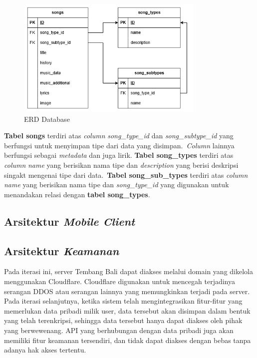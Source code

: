 \begin{figure}[H]
    \centering
    \includegraphics[width=0.8\textwidth]{assets/erd.png}
    \caption{ERD Database}
\end{figure}

\textbf{Tabel songs} terdiri atas \textit{column} \textit{song\_type\_id} dan \textit{song\_subtype\_id} yang berfungsi untuk menyimpan tipe dari data yang disimpan.\
\textit{Column} lainnya berfungsi sebagai \textit{metadata} dan juga lirik.
\textbf{Tabel song\_types} terdiri atas \textit{column} \textit{name} yang berisikan nama tipe dan \textit{description} yang berisi deskripsi singakt mengenai tipe dari data.\
\textbf{Tabel song\_sub\_types} terdiri atas \textit{column} \textit{name} yang berisikan nama tipe dan \textit{song\_type\_id} yang digunakan untuk menandakan relasi dengan \textbf{tabel song\_types}.\

\subsection{Arsitektur \textit{Mobile Client}}

\subsection{Arsitektur \textit{Keamanan}}
Pada iterasi ini, server Tembang Bali dapat diakses melalui domain yang dikelola menggunakan Cloudflare. Cloudflare digunakan untuk mencegah terjadinya serangan DDOS atau serangan lainnya yang memungkinkan terjadi pada server.
Pada iterasi selanjutnya, ketika sistem telah mengintegrasikan fitur-fitur yang memerlukan data pribadi milik user, data tersebut akan disimpan dalam bentuk yang telah terenkripsi, sehingga data tersebut hanya dapat diakses oleh pihak yang berwewenang.
API yang berhubungan dengan data pribadi juga akan memiliki fitur keamanan tersendiri, dan tidak dapat diakses dengan bebas tanpa adanya hak akses tertentu.
